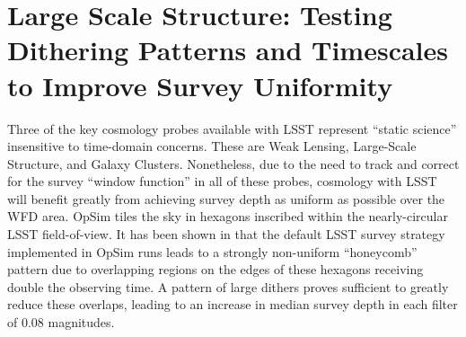 %
%
%
%
%
%
%
\clearpage
\section{Large Scale Structure:  Testing Dithering Patterns and Timescales to Improve Survey Uniformity}
\def\secname{lss}\label{sec:\secname}




Three of the key cosmology probes available with LSST represent ``static science'' insensitive to time-domain concerns.  These are Weak Lensing, Large-Scale Structure, and Galaxy Clusters.  Nonetheless, due to the need to track and correct for the survey ``window function'' in all of these probes, cosmology with LSST will benefit greatly from achieving survey depth as uniform as possible over the WFD area.  OpSim tiles the sky in hexagons inscribed within the nearly-circular LSST field-of-view.  It has been shown in \citet{CarrollEtal2014} that the default LSST survey strategy implemented in OpSim runs leads to a strongly non-uniform ``honeycomb'' pattern due to overlapping regions on the edges of these hexagons receiving double the observing time.  A pattern of large dithers proves sufficient to greatly reduce these overlaps, leading to an increase in median survey depth in each filter of 0.08 magnitudes.  

